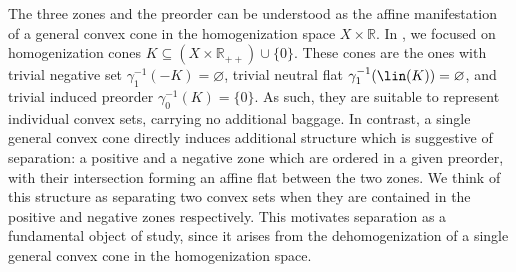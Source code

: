 \documentclass{article}
\theoremstyle{plain}
\theoremstyle{definition}
\theoremstyle{remark}
\begin{document}
The three zones and the preorder can be understood as the affine manifestation of a general convex cone in the homogenization space $X \times \mathbb{R}$.
In , we focused on homogenization cones $K \subseteq (X \times \mathbb{R}_{++}) \cup \{0\}$.
These cones are the ones with trivial negative set $\gamma_1^{-1}(-K) = \varnothing$, trivial neutral flat $\gamma_1^{-1}(\lin(K))= \varnothing$, 
and trivial induced preorder $\gamma_0^{-1}(K) = \{0\}$. As such, they are
suitable to represent individual convex sets, carrying no additional baggage. 
In contrast, a single general convex cone directly induces additional structure which is suggestive of separation: a positive and a negative zone which are ordered in a given preorder,
with their intersection forming an affine flat between the two zones. We think of this structure as separating two convex sets when they are contained in the positive and negative zones respectively.
This motivates separation as a fundamental object of study, since it arises from the dehomogenization of a single general convex cone in the homogenization space.
\end{document}
